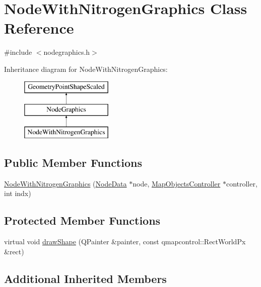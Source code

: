 \hypertarget{class_node_with_nitrogen_graphics}{}\section{Node\+With\+Nitrogen\+Graphics Class Reference}
\label{class_node_with_nitrogen_graphics}


{\ttfamily \#include $<$nodegraphics.\+h$>$}

Inheritance diagram for Node\+With\+Nitrogen\+Graphics\+:\begin{figure}[H]
\begin{center}
\leavevmode
\includegraphics[height=3.000000cm]{d1/dc6/class_node_with_nitrogen_graphics}
\end{center}
\end{figure}
\subsection*{Public Member Functions}
\begin{DoxyCompactItemize}
\item 
\mbox{\hyperlink{class_node_with_nitrogen_graphics_a82d85b2b7a2b023b1e5b23fa6b6ce410}{Node\+With\+Nitrogen\+Graphics}} (\mbox{\hyperlink{class_node_data}{Node\+Data}} $\ast$node, \mbox{\hyperlink{class_map_objects_controller}{Map\+Objects\+Controller}} $\ast$controller, int indx)
\end{DoxyCompactItemize}
\subsection*{Protected Member Functions}
\begin{DoxyCompactItemize}
\item 
virtual void \mbox{\hyperlink{class_node_with_nitrogen_graphics_adbaf1a906e787106914cb107a5f52bcc}{draw\+Shape}} (Q\+Painter \&painter, const qmapcontrol\+::\+Rect\+World\+Px \&rect)
\end{DoxyCompactItemize}
\subsection*{Additional Inherited Members}


